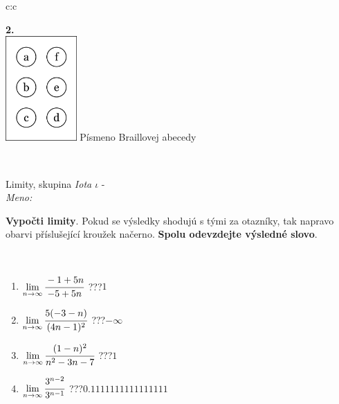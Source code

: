 \documentclass[10pt]{report}
\begin{document}
\begin{tabular}{c:c}
\begin{minipage}[c][104.5mm][t]{0.5\linewidth}
\begin{center}
\begin{minipage}{0.20\linewidth}
\begin{center}
{\Huge\bfseries 2.} \\[2mm]
\includegraphics[height=40mm]{../images/braille.png}
{\small Písmeno Braillovej abecedy}
\end{center}
\end{minipage}
\end{center}
\end{minipage}
\\ \hdashline
\begin{minipage}[c][104.5mm][t]{0.5\linewidth}
\begin{center}
\vspace{7mm}
{\huge Limity, skupina \textit{Iota $\iota$} -}\\[5mm]
\textit{Meno:}\phantom{xxxxxxxxxxxxxxxxxxxxxxxxxxxxxxxxxxxxxxxxxxxxxxxxxxxxxxxxxxxxxxxxx}\\[5mm]
\begin{minipage}{0.95\linewidth}
\begin{center}
\textbf{Vypočti limity}. Pokud se výsledky shodujú s tými za otazníky, tak napravo\\obarvi příslušející kroužek načerno. \textbf{Spolu odevzdejte výsledné slovo}.
\end{center}
\end{minipage}
\\[1mm]
\begin{minipage}{0.79\linewidth}
\begin{center}
\begin{varwidth}{\linewidth}
\begin{enumerate}
\normalsize
\item $\lim\limits_{n\to\infty}\cfrac{-1+5n}{-5+5n}$\quad \dotfill\; ???\;\dotfill \quad $1$
\item $\lim\limits_{n\to\infty}\cfrac{5(-3-n)}{(4n-1)^2}$\quad \dotfill\; ???\;\dotfill \quad $-\infty$
\item $\lim\limits_{n\to\infty}\cfrac{(1-n)^2}{n^2-3n-7}$\quad \dotfill\; ???\;\dotfill \quad $1$
\item $\lim\limits_{n\to\infty}\cfrac{3^{n-2}}{3^{n-1}}$\quad \dotfill\; ???\;\dotfill \quad $0.1111111111111111$

\end{enumerate}
\end{varwidth}
\end{center}
\end{minipage}
\end{center}
\end{minipage}
\end{tabular}
\end{document}
